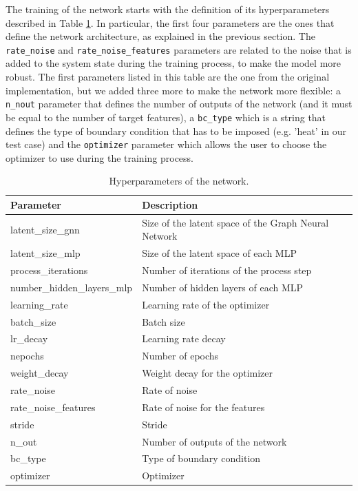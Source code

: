 \documentclass[11pt,a4paper]{article}
\begin{document}
The training of the network starts with the definition of its hyperparameters described in Table \ref{hyperparams_description}. In particular, the first four parameters are the ones that define the network architecture, as explained in the previous section. The \texttt{rate\_noise} and \texttt{rate\_noise\_features} parameters are related to the noise that is added to the system state during the training process, to make the model more robust. The first parameters listed in this table are the one from the original implementation, but we added three more to make the network more flexible: a \texttt{n\_nout} parameter that defines the number of outputs of the network (and it must be equal to the number of target features), a \texttt{bc\_type} which is a string that defines the type of boundary condition that has to be imposed (e.g. 'heat' in our test case) and the \texttt{optimizer} parameter which allows the user to choose the optimizer to use during the training process.

\begin{table}[H]
\centering
\begin{tabular}{|l|l|}
\hline
\textbf{Parameter} & \textbf{Description} \\
\hline
latent\_size\_gnn & Size of the latent space of the Graph Neural Network \\
latent\_size\_mlp & Size of the latent space of each MLP \\
process\_iterations & Number of iterations of the process step \\
number\_hidden\_layers\_mlp & Number of hidden layers of each MLP \\
learning\_rate & Learning rate of the optimizer \\
batch\_size & Batch size \\
lr\_decay & Learning rate decay \\
nepochs & Number of epochs \\
weight\_decay & Weight decay for the optimizer \\
rate\_noise & Rate of noise \\
rate\_noise\_features & Rate of noise for the features \\
stride & Stride \\
n\_out & Number of outputs of the network \\
bc\_type & Type of boundary condition \\
optimizer & Optimizer \\
\hline
\end{tabular}
\caption{Hyperparameters of the network.}
\label{hyperparams_description}
\end{table}
\end{document}
